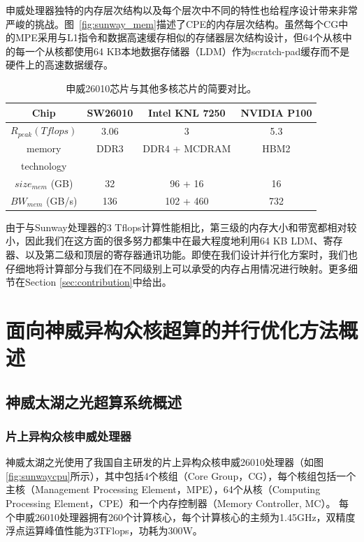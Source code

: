 \documentclass[degree=doctor]{thuthesis}
\begin{document}
申威处理器独特的内存层次结构以及每个层次中不同的特性也给程序设计带来非常严峻的挑战。图~\ref {fig:sunway_mem}描述了CPE的内存层次结构。虽然每个CG中的MPE采用与L1指令和数据高速缓存相似的存储器层次结构设计，但64个从核中的每一个从核都使用64 KB本地数据存储器（LDM）作为scratch-pad缓存而不是硬件上的高速数据缓存。




\begin{table}[ht]
\caption{申威26010芯片与其他多核芯片的简要对比。}
\label{tb:proc-comp}
\centering
\begin{tabular*}{0.8\columnwidth}{cccc}
\hline\hline
  Chip & SW26010 & Intel KNL 7250 & NVIDIA P100 \\\hline
    $R_{peak} (Tflops)$ & 3.06 & 3 & 5.3 \\\hline
    memory   & DDR3 & DDR4 + MCDRAM & HBM2 \\
    technology \\\hline
    $size_{mem}$ (GB) & 32 & 96 + 16 & 16 \\\hline
    $BW_{mem}$ (GB/s)  & 136 & 102 + 460 & 732 \\\hline
\hline
\end{tabular*}
\end{table}

由于与Sunway处理器的3 Tflops计算性能相比，第三级的内存大小和带宽都相对较小，因此我们在这方面的很多努力都集中在最大程度地利用64 KB LDM、寄存器、以及第二级和顶层的寄存器通讯功能。即使在我们设计并行化方案时，我们也仔细地将计算部分与我们在不同级别上可以承受的内存占用情况进行映射。更多细节在Section \ref{sec:contribution}中给出。


\chapter{面向神威异构众核超算的并行优化方法概述}

\section{神威太湖之光超算系统概述}
\subsection{片上异构众核申威处理器}


神威太湖之光使用了我国自主研发的片上异构众核申威26010处理器（如图\ref{fig:sunwaycpu}所示），其中包括4个核组（Core Group，CG）\citep {fu2016sunway}，每个核组包括一个主核（Management Processing Element，MPE），64个从核（Computing Processing Element，CPE）和一个内存控制器（Memory Controller, MC）。 每个申威26010处理器拥有260个计算核心，每个计算核心的主频为1.45GHz，双精度浮点运算峰值性能为3TFlops，功耗为300W。
\end{document}
